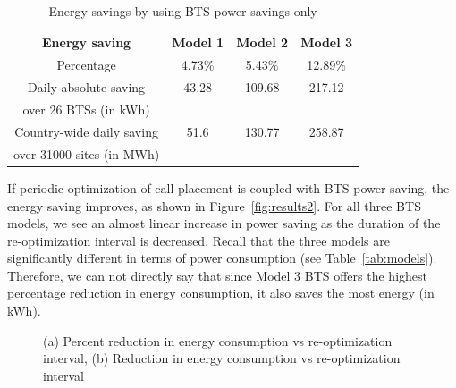 \begin{table}
\centering
\begin{tabular}{|c|c|c|c|}
\hline Energy saving & Model 1 & Model 2 & Model 3 \\
\hline Percentage & 4.73\% & 5.43\% & 12.89\% \\
\hline Daily absolute saving & 43.28 & 109.68 & 217.12 \\
over 26 BTSs (in kWh) & \ & \ & \ \\
\hline Country-wide daily saving & 51.6 & 130.77 & 258.87\\
over 31000 sites (in MWh) & \ & \ & \ \\
\hline
\end{tabular}
\vspace{+0.1in}
\caption{Energy savings by using BTS power savings only}
\label{tab:psonly}
\end{table}

If periodic optimization of call placement is coupled with BTS power-saving, the energy saving improves, as shown in Figure~\ref{fig:results2}. For all three BTS models, we see an almost linear increase in power saving as the duration of the re-optimization interval is decreased. Recall that the three models are significantly different in terms of power consumption (see Table~\ref{tab:models}). Therefore, we can not directly say that since Model 3 BTS offers the highest percentage reduction in energy consumption, it also saves the most energy (in kWh).

\begin{figure}
\centering
{}
\caption{(a) Percent reduction in energy consumption vs re-optimization interval, (b) Reduction in energy consumption vs re-optimization interval}
\label{fig:results24}
\end{figure}


